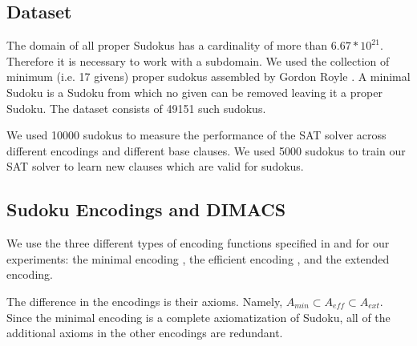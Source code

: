 \documentclass{article}
\begin{document}
\subsection{Dataset}
The domain of all proper Sudokus has a cardinality of more than $6.67*10^21$. Therefore it is necessary to work with a subdomain. We used the collection of minimum (i.e. 17 givens) proper sudokus assembled by Gordon Royle \cite{sudokudataset}.  A minimal Sudoku is a Sudoku from which no given can be removed leaving it a proper Sudoku. The dataset consists of 49151 such sudokus. %

We used 10000 sudokus to measure the performance of the SAT solver across different encodings and different base clauses. We used 5000 sudokus to train our SAT solver to learn new clauses which are valid for sudokus.

\subsection{Sudoku Encodings and DIMACS}

We use the three different types of encoding functions specified in \cite{sudokusat} and \cite{optimizedencoding} for our experiments: the minimal encoding , the efficient encoding , and the extended encoding.



The difference in the encodings is their axioms. Namely, $A_{min}\subset A_{eff}\subset A_{ext}$. Since the minimal encoding is a complete axiomatization of Sudoku, all of the additional axioms in the other encodings are redundant.
\end{document}
